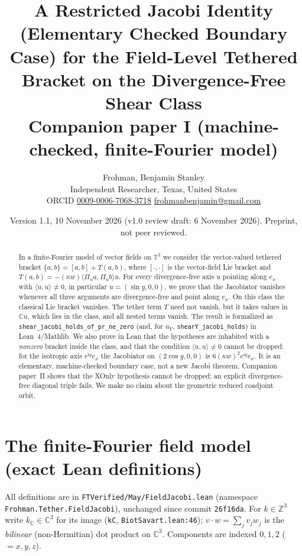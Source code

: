 \documentclass[11pt]{article}\emergencystretch=2em
\author{Frohman, Benjamin Stanley\\ \small Independent Researcher, Texas, United States\\ \small ORCID \href{https://orcid.org/0009-0006-7068-3718}{0009-0006-7068-3718} \quad \href{mailto:frohmanbenjamin@gmail.com}{frohmanbenjamin@gmail.com}}
\date{Version 1.1, 10 November 2026 (v1.0 review draft: 6 November 2026). Preprint, not peer reviewed.}
\title{A Restricted Jacobi Identity (Elementary Checked Boundary Case) for the Field-Level Tethered Bracket on the Divergence-Free Shear Class\\ \large Companion paper I (machine-checked, finite-Fourier model)}
\theoremstyle{definition}\newtheorem{definition}[theorem]{Definition}\theoremstyle{remark}\newtheorem{remark}[theorem]{Remark}
\newcommand{\ii}{\mathrm{i}}
\begin{document}
\maketitle
\begin{abstract}
In a finite-Fourier model of vector fields on $\mathbb T^3$ we consider the vector-valued tethered bracket $\{a,b\}=[a,b]+T(a,b)$, where $[\cdot,\cdot]$ is the vector-field Lie bracket and $T(a,b)=-(\kappa w)\langle\Pi_u a,\Pi_u b\rangle u$. For every divergence-free axis $u$ pointing along $e_x$ with $\langle u,u\rangle\ne0$, in particular $u=(\sin y,0,0)$, we prove that the Jacobiator vanishes whenever all three arguments are divergence-free and point along $e_x$. On this class the classical Lie bracket vanishes. The tether term $T$ need not vanish, but it takes values in $\mathbb C u$, which lies in the class, and all nested terms vanish. The result is formalized as \texttt{shear\_jacobi\_holds\_of\_pr\_ne\_zero} (and, for $u_Y$, \texttt{shearY\_jacobi\_holds}) in Lean~4/Mathlib. We also prove in Lean that the hypotheses are inhabited with a \emph{nonzero} bracket inside the class, and that the condition $\langle u,u\rangle\ne0$ cannot be dropped: for the isotropic axis $e^{\ii y}e_x$ the Jacobiator on $(2\cos y,0,0)$ is $6(\kappa w)^2e^{\ii y}e_x$. It is an elementary, machine-checked boundary case, not a new Jacobi theorem. Companion paper~II shows that the XOnly hypothesis cannot be dropped: an explicit divergence-free diagonal triple fails. We make no claim about the geometric reduced coadjoint orbit.
\end{abstract}
\section{The finite-Fourier field model (exact Lean definitions)}
All definitions are in \nolinkurl{FTVerified/May/FieldJacobi.lean} (namespace\\ \texttt{Frohman.Tether.FieldJacobi}), unchanged since commit \texttt{26f16da}. For $k\in\mathbb Z^3$ write $k_{\mathbb C}\in\mathbb C^3$ for its image (\texttt{kC}, \texttt{BiotSavart.lean:46}); $v\cdot w=\sum_{j}v_jw_j$ is the \emph{bilinear} (non-Hermitian) dot product on $\mathbb C^3$. Components are indexed $0,1,2$ ($=x,y,z$).
\end{document}
